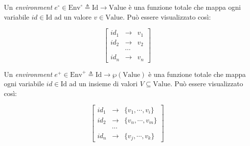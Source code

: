 \documentclass{article}
\begin{document}
Un \textit{environment} \(e^{\circ}\in\mathrm{Env}^{\circ}\triangleq \mathrm{Id}\rightarrow \mathrm{Value}\) è una funzione totale che mappa ogni variabile \(id \in\textrm{Id}\) ad un valore \(v\in\textrm{Value}\). Può essere visualizzato così:

\[
  \left[
  \begin{array}{ccl}
  id_1 &\longrightarrow &v_1 \\
  id_2 &\longrightarrow &v_2 \\
      &\cdots          &  \\
  id_n &\longrightarrow &v_n
  \end{array}
  \right]
\]


Un \textit{environment} \(e^{+}\in\mathrm{Env}^{+}\triangleq \mathrm{Id}\rightarrow \wp(\mathrm{Value})\) è una funzione totale che mappa ogni variabile \(id \in\textrm{Id}\) ad un insieme di valori  \(V\subseteq\textrm{Value}\). Può essere visualizzato così:

\[
  \left[
  \begin{array}{ccc}
  id_1 &\longrightarrow &\{v_1, \cdots, v_i\} \\
  id_2 &\longrightarrow &\{v_n, \cdots, v_m\} \\
      &\cdots          &  \\
  id_n &\longrightarrow &\{v_j, \cdots, v_k\}
  \end{array}
  \right]
\]
\end{document}
